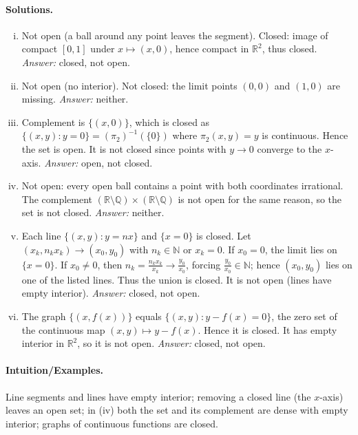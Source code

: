 \documentclass[12pt,a4paper]{article}
\theoremstyle{plain}
\theoremstyle{definition}
\theoremstyle{remark}
\theoremstyle{remark}
\begin{document}
\paragraph{Solutions.}
\begin{enumerate}[(i)]
	\item Not open (a ball around any point leaves the segment). Closed: image of compact $[0,1]$ under $x\mapsto(x,0)$, hence compact in $\mathbb{R}^2$, thus closed. \emph{Answer:} closed, not open.
	
	\item Not open (no interior). Not closed: the limit points $(0,0)$ and $(1,0)$ are missing. \emph{Answer:} neither.
	
	\item Complement is $\{(x,0)\}$, which is closed as $\{(x,y):y=0\}=(\pi_2)^{-1}(\{0\})$ where $\pi_2(x,y)=y$ is continuous. Hence the set is open. It is not closed since points with $y\to 0$ converge to the $x$-axis. \emph{Answer:} open, not closed.
	
	\item Not open: every open ball contains a point with both coordinates irrational. The complement 
	$(\mathbb{R}\setminus\mathbb{Q})\times(\mathbb{R}\setminus\mathbb{Q})$ is not open for the same reason, so the set is not closed. \emph{Answer:} neither.
	
	\item Each line $\{(x,y):y=nx\}$ and $\{x=0\}$ is closed. Let $(x_k,n_k x_k)\to(x_0,y_0)$ with $n_k\in\mathbb{N}$ or $x_k=0$.
	If $x_0=0$, the limit lies on $\{x=0\}$. If $x_0\neq 0$, then $n_k=\frac{n_k x_k}{x_k}\to \frac{y_0}{x_0}$, forcing $\frac{y_0}{x_0}\in\mathbb{N}$; hence $(x_0,y_0)$ lies on one of the listed lines. Thus the union is closed. It is not open (lines have empty interior). \emph{Answer:} closed, not open.
	
	\item The graph $\{(x,f(x))\}$ equals $\{(x,y): y-f(x)=0\}$, the zero set of the continuous map $(x,y)\mapsto y-f(x)$. Hence it is closed. It has empty interior in $\mathbb{R}^2$, so it is not open. \emph{Answer:} closed, not open.
\end{enumerate}

\paragraph{Intuition/Examples.}
Line segments and lines have empty interior; removing a closed line (the $x$-axis) leaves an open set;
in (iv) both the set and its complement are dense with empty interior; graphs of continuous functions are closed.
\end{document}
